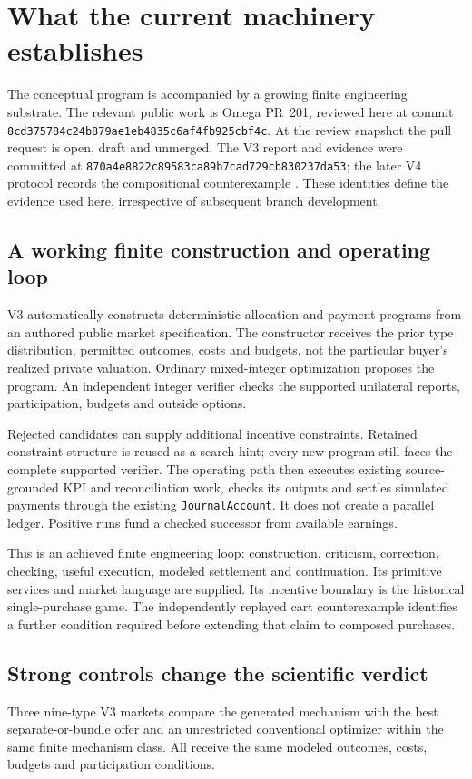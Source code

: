 \section{What the current machinery establishes}\label{sec:evidence}
The conceptual program is accompanied by a growing finite engineering substrate. The relevant public work is Omega PR~201, reviewed here at commit \nolinkurl{8cd375784c24b879ae1eb4835c6af4fb925cbf4c}. At the review snapshot the pull request is open, draft and unmerged. The V3 report and evidence were committed at \nolinkurl{870a4e8822c89583ca89b7cad729cb830237da53}; the later V4 protocol records the compositional counterexample \cite{omegav3,omegav4}. These identities define the evidence used here, irrespective of subsequent branch development.

\subsection{A working finite construction and operating loop}
V3 automatically constructs deterministic allocation and payment programs from an authored public market specification. The constructor receives the prior type distribution, permitted outcomes, costs and budgets, not the particular buyer's realized private valuation. Ordinary mixed-integer optimization proposes the program. An independent integer verifier checks the supported unilateral reports, participation, budgets and outside options.

Rejected candidates can supply additional incentive constraints. Retained constraint structure is reused as a search hint; every new program still faces the complete supported verifier. The operating path then executes existing source-grounded KPI and reconciliation work, checks its outputs and settles simulated payments through the existing \texttt{JournalAccount}. It does not create a parallel ledger. Positive runs fund a checked successor from available earnings.

This is an achieved finite engineering loop: construction, criticism, correction, checking, useful execution, modeled settlement and continuation. Its primitive services and market language are supplied. Its incentive boundary is the historical single-purchase game. The independently replayed cart counterexample identifies a further condition required before extending that claim to composed purchases.

\subsection{Strong controls change the scientific verdict}
Three nine-type V3 markets compare the generated mechanism with the best separate-or-bundle offer and an unrestricted conventional optimizer within the same finite mechanism class. All receive the same modeled outcomes, costs, budgets and participation conditions.

